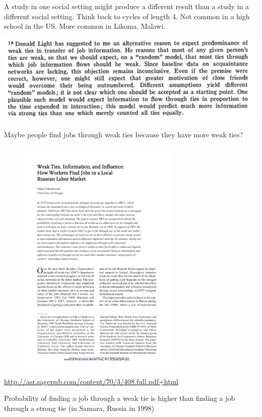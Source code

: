 \documentclass[aspectratio=169]{beamer}
\begin{document}
\begin{frame}

A study in one social setting might produce a different result than a study in a different social setting.  Think back to cycles of length 4.  Not common in a high school in the US. More common in Likoma, Malawi.

\end{frame}
\begin{frame}

\includegraphics[width=\textwidth]{figures/granovetter_strength_1973_ft18}

\end{frame}
\begin{frame}

Maybe people find jobs through weak ties because they have more weak ties?  

\pause

\vfill
\begin{figure}
\includegraphics[width=0.7\textwidth]{figures/yakubovich_weak_2005_title}
\end{figure}

\url{http://asr.sagepub.com/content/70/3/408.full.pdf+html}

Probability of finding a job through a weak tie is higher than finding a job through a strong tie (in Samara, Russia in 1998)

\end{frame}
\end{document}
